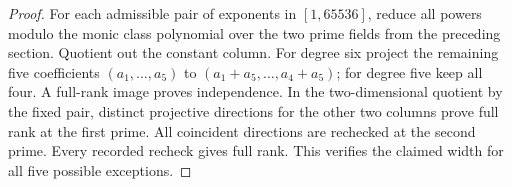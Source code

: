 \begin{proof}
For each admissible pair of exponents in $[1,65536]$, reduce all powers modulo the monic class polynomial over the two prime fields from the preceding section. Quotient out the constant column. For degree six project the remaining five coefficients $(a_1,\ldots,a_5)$ to $(a_1+a_5,\ldots,a_4+a_5)$; for degree five keep all four. A full-rank image proves independence. In the two-dimensional quotient by the fixed pair, distinct projective directions for the other two columns prove full rank at the first prime. All coincident directions are rechecked at the second prime. Every recorded recheck gives full rank. This verifies the claimed width for all five possible exceptions.
\end{proof}
